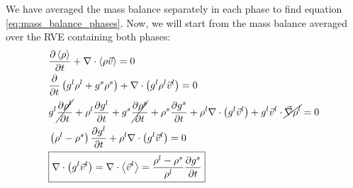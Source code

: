 \documentclass[11pt,a4paper]{article}
\begin{document}
We have averaged the mass balance separately in each phase to find equation \eqref{eq:mass_balance_phases}.
Now, we will start from the mass balance averaged over the RVE containing both phases:
\begin{subequations}
\begin{align}
& \frac{\partial \left\langle \rho \right\rangle}{\partial t} + \nabla \cdot \left\langle \rho \vec{v} \right\rangle  = 0 \\ 
& \frac{\partial }{\partial t} \left(  g^l \rho^l + g^s \rho^s \right) + \nabla \cdot \left(  g^l \rho^l \vec{v}^l \right) = 0 \\ 
& g^l \cancel{\frac{\partial \rho^l }{\partial t}} + \rho^l \frac{\partial  g^l }{\partial t} 
	+ g^s \cancel{\frac{\partial \rho^s }{\partial t}} + \rho^s \frac{\partial  g^s }{\partial t} 
	+ \rho^l \nabla \cdot \left(  g^l \vec{v}^l \right) 
	+ g^l \vec{v}^l \cdot  \cancel{ \vec{\nabla} \rho^l }	 = 0 \\
& \left(  \rho^l - \rho^s  \right) \frac{\partial  g^l }{\partial t} + \rho^l \nabla \cdot \left(  g^l \vec{v}^l \right)  = 0 \\
\label{eq:mass_balance}
& \boxed{\nabla \cdot \left(  g^l \vec{v}^l \right) 
 	= \nabla \cdot \left\langle \vec{v}^l \right\rangle 
 	= \frac{\rho^l-\rho^s}{\rho^l} \frac{\partial  g^s }{\partial t}}
\end{align}
\end{subequations}
\end{document}
